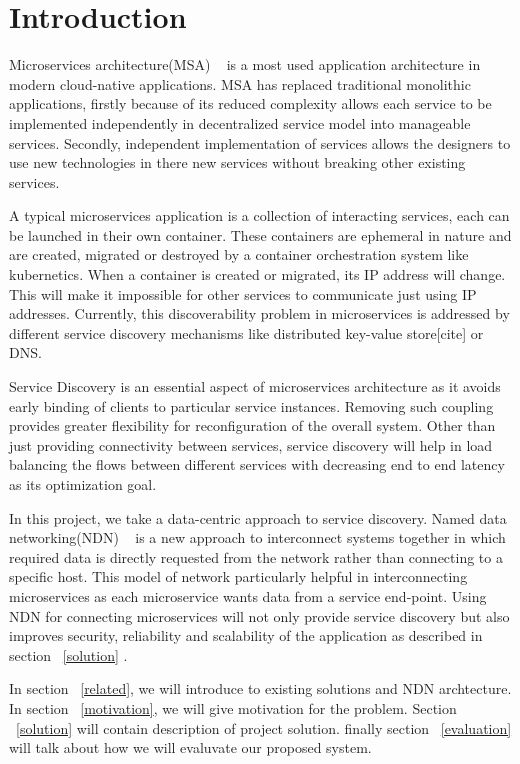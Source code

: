 \section{Introduction}
\label{intro}

Microservices architecture(MSA) ~\cite{dragoni2016microservices} is a most used application architecture in modern cloud-native applications. MSA has replaced traditional monolithic applications, firstly because of its reduced complexity allows each service to be implemented independently in decentralized service model into manageable services. Secondly, independent implementation of services allows the designers to use new technologies in there new services without breaking other existing services. 

A typical microservices application is a collection of interacting services, each can be launched in their own container. These containers are ephemeral in nature and are created, migrated or destroyed by a container orchestration system like kubernetics. When a container is created or migrated, its IP address will change. This will make it impossible for other services to communicate just using IP addresses. Currently, this discoverability problem in microservices is addressed by different service discovery mechanisms like distributed key-value store[cite] or DNS. 

Service Discovery is an essential aspect of microservices architecture as it avoids early binding of clients to particular service instances. Removing such coupling provides greater flexibility for reconfiguration of the overall system. Other than just providing connectivity between services, service discovery will help in load balancing the flows between different services with decreasing end to end latency as its optimization goal.

In this project, we take a data-centric approach to service discovery. Named data networking(NDN) ~\cite{ndn} is a new approach to interconnect systems together in which required data is directly requested from the network rather than connecting to a specific host. This model of network particularly helpful in interconnecting microservices as each microservice wants data from a service end-point. Using NDN for connecting microservices will not only provide service discovery but also improves security, reliability and scalability of the application as described in section ~\ref{solution} .
 
In section ~\ref{related}, we will introduce to existing solutions and NDN archtecture. In section ~\ref{motivation}, we will give motivation for the problem. Section ~\ref{solution} will contain description of project solution. finally section ~\ref{evaluation} will talk about how we will evaluvate our proposed system.
